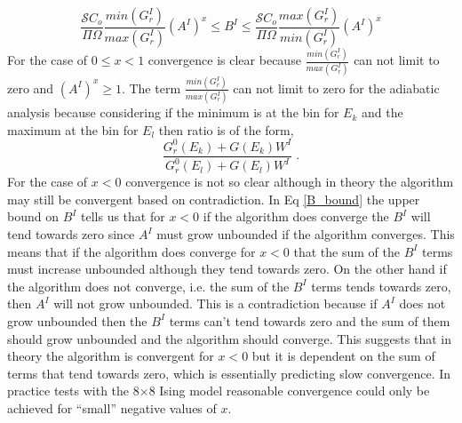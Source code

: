 \documentclass[aps,pre,reprint,superscriptaddress,showkeys]{revtex4-1}
\begin{document}
\begin{equation}
 \frac{\mathcal{S}C_o}{\Pi\Omega} \frac{min(G_r^{I})}{ max(G_r^{I})}(A^I)^x \le B^I  \le  \frac{\mathcal{S}C_o}{\Pi\Omega}\frac{max(G_r^{I})}{ min(G_r^{I})}(A^I)^x
 \label{B_bound}
\end{equation}
For the case of $0\le x < 1 $ convergence is clear because $\frac{min(G_r^{I})}{ max(G_r^{I})}$ can not limit to zero and $(A^I)^x \ge 1$. The term $\frac{min(G_r^{I})}{ max(G_r^{I})}$ can not limit to zero for the adiabatic analysis because considering if the minimum is at the bin for $E_k$ and the maximum at the bin for $E_l$ then ratio is of the form,
\begin{equation}
\frac{G_r^{0}(E_k) + G(E_k)W^I}{G_r^{0}(E_l) + G(E_l)W^I} \;.
\end{equation}
 For the case of $x < 0$ convergence is not so clear although in theory the algorithm may still be convergent based on contradiction. In Eq \ref{B_bound} the upper bound on $B^I$ tells us that for $x<0$ if the algorithm does converge the $B^I$ will tend towards zero since $A^I$ must grow unbounded if the algorithm converges. This means that if the algorithm does converge for $x<0$ that the sum of the $B^I$ terms must increase unbounded although they tend towards zero. On the other hand if the algorithm does not converge, i.e. the sum of the $B^I$ terms tends towards zero, then $A^I$ will not grow unbounded. This is a contradiction because if $A^I$ does not grow unbounded then the $B^I$ terms can't tend towards zero and the sum of them should grow unbounded and the algorithm should converge. This suggests that in theory the algorithm is convergent for $x<0$ but it is dependent on the sum of terms that tend towards zero, which is essentially predicting slow convergence. In practice tests with the 8$\times$8 Ising model reasonable convergence could only be achieved for ``small'' negative values of $x$. 
\end{document}
